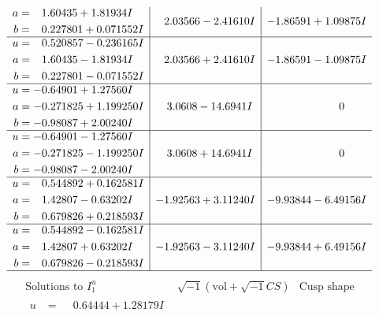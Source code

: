 \documentclass[1p]{elsarticle_modified}
\theoremstyle{definition}
\newcommand{\I}{\sqrt{-1}}
\begin{document}
$$\begin{array}{c|c|c}
\begin{aligned}
a &= \phantom{-}1.60435 + 1.81934 I \\
b &= \phantom{-}0.227801 + 0.071552 I\end{aligned}
 & \phantom{-}2.03566 - 2.41610 I & -1.86591 + 1.09875 I \\ \hline\begin{aligned}
u &= \phantom{-}0.520857 - 0.236165 I \\
a &= \phantom{-}1.60435 - 1.81934 I \\
b &= \phantom{-}0.227801 - 0.071552 I\end{aligned}
 & \phantom{-}2.03566 + 2.41610 I & -1.86591 - 1.09875 I \\ \hline\begin{aligned}
u &= -0.64901 + 1.27560 I \\
a &= -0.271825 + 1.199250 I \\
b &= -0.98087 + 2.00240 I\end{aligned}
 & \phantom{-}3.0608 - 14.6941 I & \phantom{-0.000000 } 0 \\ \hline\begin{aligned}
u &= -0.64901 - 1.27560 I \\
a &= -0.271825 - 1.199250 I \\
b &= -0.98087 - 2.00240 I\end{aligned}
 & \phantom{-}3.0608 + 14.6941 I & \phantom{-0.000000 } 0 \\ \hline\begin{aligned}
u &= \phantom{-}0.544892 + 0.162581 I \\
a &= \phantom{-}1.42807 - 0.63202 I \\
b &= \phantom{-}0.679826 + 0.218593 I\end{aligned}
 & -1.92563 + 3.11240 I & -9.93844 - 6.49156 I \\ \hline\begin{aligned}
u &= \phantom{-}0.544892 - 0.162581 I \\
a &= \phantom{-}1.42807 + 0.63202 I \\
b &= \phantom{-}0.679826 - 0.218593 I\end{aligned}
 & -1.92563 - 3.11240 I & -9.93844 + 6.49156 I\\
 \hline 
 \end{array}$$\newpage$$\begin{array}{c|c|c}  
\text{Solutions to }I^u_{1}& \I (\text{vol} + \sqrt{-1}CS) & \text{Cusp shape}\\
 \hline 
\begin{aligned}
u &= \phantom{-}0.64444 + 1.28179 I \\

\end{aligned}
\end{array}$$
\end{document}
